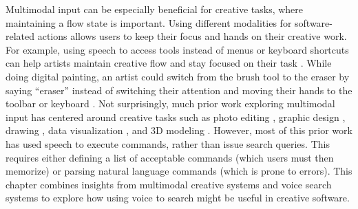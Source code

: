 Multimodal input can be especially beneficial for creative tasks, where maintaining a flow state is important. Using different modalities for software-related actions allows users to keep their focus and hands on their creative work. For example, using speech to access tools instead of menus or keyboard shortcuts can help artists maintain creative flow and stay focused on their task \cite{Kim2019, Sedivy1999}. While doing digital painting, an artist could switch from the brush tool to the eraser by saying ``eraser'' instead of switching their attention and moving their hands to the toolbar or keyboard \cite{Kim2019}. Not surprisingly, much prior work exploring multimodal input has centered around creative tasks such as photo editing \cite{Laput2013}, graphic design \cite{Kim2019}, drawing \cite{Sedivy1999, Pausch1991}, data visualization \cite{Setlur2016}, and 3D modeling \cite{Sharma2011}. However, most of this prior work has used speech to execute commands, rather than issue search queries. This requires either defining a list of acceptable commands (which users must then memorize) or parsing natural language commands (which is prone to errors). This chapter combines insights from multimodal creative systems and voice search systems to explore how using voice to search might be useful in creative software.
